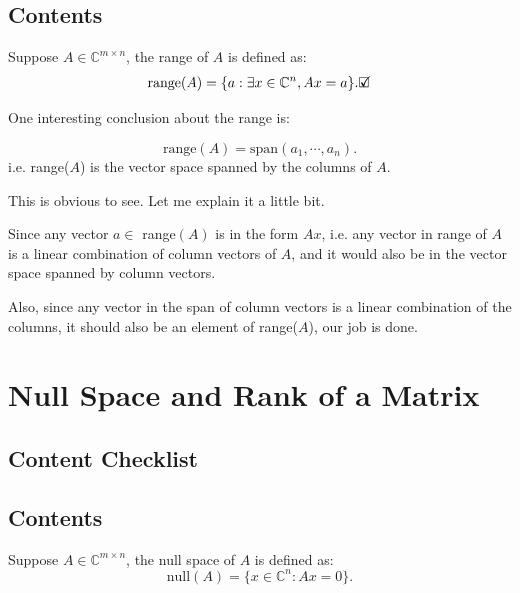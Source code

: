 \subsection*{Contents}
\begin{definition}
  Suppose \(A \in \mathbb{C}^{m \times n}\), the range of \(A\) is defined as:
  \[
  \text{range}(A) = \{a : \exists x \in \mathbb{C}^{n}, Ax = a \}
  .\checked\]
\end{definition}
One interesting conclusion about the range is:
\begin{prop}
  \[
    \text{range}(A) = \text{span}(a_1, \cdots, a_n)
  .\] 
  i.e. range($A$) is the vector space spanned by the columns of $A$.
\end{prop}
This is obvious to see. Let me explain it a little bit. 

\noindent Since any vector \(a \in\) range\((A)\)  is in the form \(Ax\), i.e. any vector in range of \(A\)  is a linear combination of column vectors of \(A\), and it would also be in the vector space spanned by column vectors.

\noindent Also, since any vector in the span of column vectors is a linear combination of the columns, it should also be an element of range($A$), our job is done. \checked


\section{Null Space and Rank of a Matrix}%
\label{sec1.5}
\subsection*{Content Checklist}
\subsection*{Contents}
\begin{definition}
  Suppose \(A \in \mathbb{C}^{m \times n}\), the null space of \(A\) is defined as:
  \[
    \text{null}(A) = \{x \in \mathbb{C}^{n}: Ax = 0\} 
  .\]
\end{definition}

